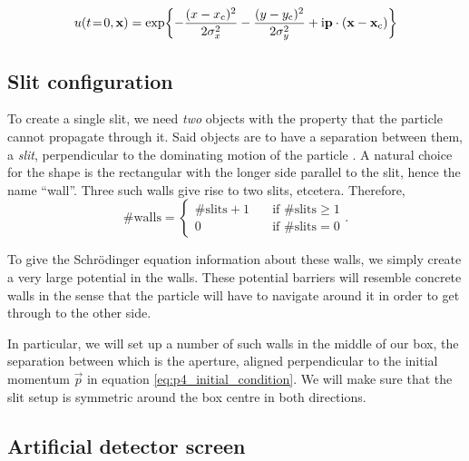     \begin{equation}\label{eq:p4_initial_condition_scalarform}
        u(t\!=\!0, \mathbf{x}) = \exp{-\frac{(x-x_\mathrm{c})^2}{2\sigma_x^2} -\frac{(y-y_\mathrm{c})^2}{2\sigma_y^2} + \mathrm{i}\mathbf{p}\cdot (\mathbf{x}-\mathbf{x}_\mathrm{c})}
    \end{equation}


\subsection{Slit configuration}\label{sec:method:slit_config}
    To create a single slit, we need \textit{two} objects with the property that the particle cannot propagate through it. Said objects are to have a separation between them, a \textit{slit}, perpendicular to the dominating motion of the particle . A natural choice for the shape is the rectangular with the longer side parallel to the slit,  hence the name ``wall''. Three such walls give rise to two slits, etcetera. Therefore, 
    \begin{equation}
        \#\mathrm{walls} = \begin{cases}
            \#\mathrm{slits} + 1 \quad &\mathrm{if}\,\, \#\mathrm{slits} \geq 1 \\
            0 \quad                     &\mathrm{if}\,\, \#\mathrm{slits} =0 
        \end{cases}.
    \end{equation}

    To give the Schrödinger equation information about these walls, we simply create a very large potential in the walls. These potential barriers will resemble concrete  walls in the sense that the particle will have to navigate around it in order to get through to the other side.

    In particular, we will set up a number of such walls in the middle of our box, the separation between which is the aperture, aligned perpendicular to the initial momentum $\vec{p}$ in equation \eqref{eq:p4_initial_condition}. We will make sure that the slit setup is symmetric around the box centre in both directions.


\subsection{Artificial detector screen}\label{sec:method:screen}

